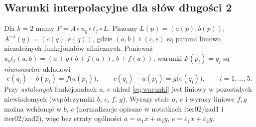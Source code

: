 \subsection{Warunki interpolacyjne dla słów długości 2}
Dla $k=2$ mamy $F=A\circ u_g\circ t_f\circ L$. Piszemy $L(p)=(a(p),b(p))$,
$A^{-1}(q)=(c(q),e(q))$, gdzie $(a,b)$ i $(c,e)$ są parami liniowo niezależnych funkcjonałów
afinicznych. Ponieważ $u_gt_f(a,b)=(a+g(b+f(a)),\,b+f(a))$, warunki $F(p_i)=q_i$ są
\emph{równoważne} układowi
\begin{equation}\label{eq:warunki}
e(q_i)-b(p_i)=f\bigl(a(p_i)\bigr),\qquad c(q_i)-a(p_i)=g\bigl(e(q_i)\bigr),\qquad i=1,\dots,5.
\end{equation}
Przy \emph{ustalonych} funkcjonałach $a$, $e$ układ \eqref{eq:warunki} jest liniowy w
pozostałych niewiadomych (współczynniki $b$, $c$, $f$, $g$). Wyrazy stałe $a$, $e$ i wyrazy liniowe
$f,g$ można wchłonąć w $b$, $c$ (normalizacje opisane w notatkach iter02/zad1 i iter02/zad2), więc
bez straty ogólności $a=\alpha_1x+\alpha_2y$, $e=\varepsilon_1x+\varepsilon_2y$.

